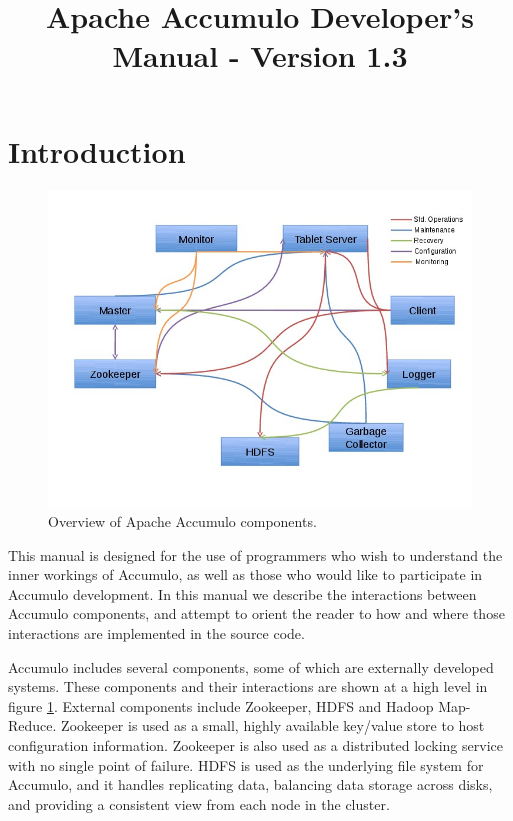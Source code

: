 \documentclass[letterpaper,onecolumn,12pt,titlepage]{article}
\title{Apache Accumulo Developer's Manual - Version 1.3}
\author{}
\begin{document}
\maketitle
\newpage
\tableofcontents
\newpage
\section{Introduction}

\begin{figure}[htbp]
\center
\includegraphics[scale=.6]{images/component_overview.jpg}
\caption{\label{fig_overview} Overview of Apache Accumulo components.}
\end{figure}
This manual is designed for the use of programmers who wish to understand the inner workings of Accumulo, as well as those who would like to participate in Accumulo development.
In this manual we describe the interactions between Accumulo components, and attempt to orient the reader to how and where those interactions are implemented in the source code.

Accumulo includes several components, some of which are externally developed systems.
These components and their interactions are shown at a high level in figure \ref{fig_overview}.
External components include Zookeeper, HDFS and Hadoop Map-Reduce.
Zookeeper is used as a small, highly available key/value store to host configuration information.
Zookeeper is also used as a distributed locking service with no single point of failure.
HDFS is used as the underlying file system for Accumulo, and it handles replicating data, balancing data storage across disks, and providing a consistent view from each node in the cluster.
\end{document}
